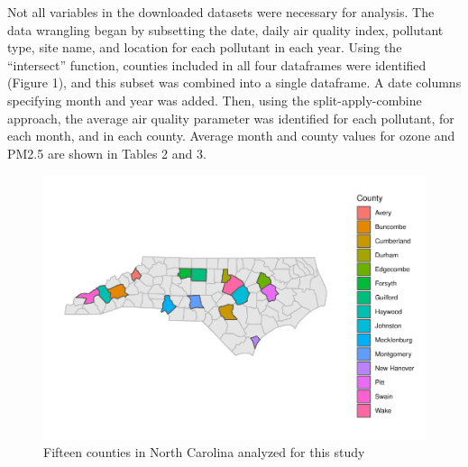 \documentclass[
  12pt,
]{article}
\begin{document}
Not all variables in the downloaded datasets were necessary for
analysis. The data wrangling began by subsetting the date, daily air
quality index, pollutant type, site name, and location for each
pollutant in each year. Using the ``intersect'' function, counties
included in all four dataframes were identified (Figure 1), and this
subset was combined into a single dataframe. A date columns specifying
month and year was added. Then, using the split-apply-combine approach,
the average air quality parameter was identified for each pollutant, for
each month, and in each county. Average month and county values for
ozone and PM2.5 are shown in Tables 2 and 3.

\begin{figure}
\centering
\includegraphics{Domeyer_FinalEDA_Sp22_files/figure-latex/geography-1.pdf}
\caption{Fifteen counties in North Carolina analyzed for this study}
\end{figure}
\end{document}

